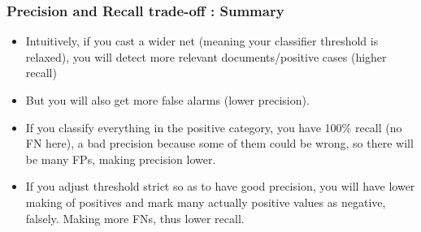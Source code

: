 









\begin{frame}[fragile]\frametitle{Precision and Recall trade-off : Summary}
\begin{itemize}
\item Intuitively, if you cast a wider net (meaning your classifier threshold is relaxed), you will detect more relevant documents/positive cases (higher recall) 
\item But you will also get more false alarms (lower precision). 
\item If you classify everything in the positive category, you have 100\% recall (no FN here), a bad precision because some of them could be wrong, so there will be many FPs, making precision lower.
\item If you adjust threshold strict so as to have good precision, you will have lower making of positives and mark many actually positive values as negative, falsely. Making more FNs, thus lower recall.
\end{itemize}
\end{frame}




